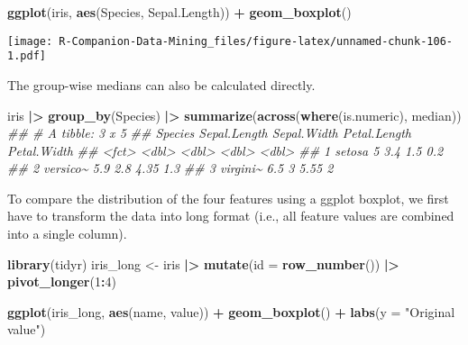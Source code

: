 \documentclass[
  notitlepage]{book}
\newenvironment{Shaded}{\begin{snugshade}}{\end{snugshade}}
\newcommand{\CommentTok}[1]{\textcolor[rgb]{0.56,0.35,0.01}{\textit{#1}}}
\newcommand{\DataTypeTok}[1]{\textcolor[rgb]{0.13,0.29,0.53}{#1}}
\newcommand{\DecValTok}[1]{\textcolor[rgb]{0.00,0.00,0.81}{#1}}
\newcommand{\ErrorTok}[1]{\textcolor[rgb]{0.64,0.00,0.00}{\textbf{#1}}}
\newcommand{\KeywordTok}[1]{\textcolor[rgb]{0.13,0.29,0.53}{\textbf{#1}}}
\newcommand{\NormalTok}[1]{#1}
\newcommand{\OperatorTok}[1]{\textcolor[rgb]{0.81,0.36,0.00}{\textbf{#1}}}
\newcommand{\StringTok}[1]{\textcolor[rgb]{0.31,0.60,0.02}{#1}}
\begin{document}
\begin{Shaded}
\begin{Highlighting}[]
\KeywordTok{ggplot}\NormalTok{(iris, }\KeywordTok{aes}\NormalTok{(Species, Sepal.Length)) }\OperatorTok{+}\StringTok{ }
\StringTok{  }\KeywordTok{geom\_boxplot}\NormalTok{()}
\end{Highlighting}
\end{Shaded}

\texttt{[image: R-Companion-Data-Mining\_files/figure-latex/unnamed-chunk-106-1.pdf]}

The group-wise medians can also be calculated directly.

\begin{Shaded}
\begin{Highlighting}[]
\NormalTok{iris }\OperatorTok{|}\ErrorTok{\textgreater{}}\StringTok{ }\KeywordTok{group\_by}\NormalTok{(Species) }\OperatorTok{|}\ErrorTok{\textgreater{}}\StringTok{ }
\StringTok{  }\KeywordTok{summarize}\NormalTok{(}\KeywordTok{across}\NormalTok{(}\KeywordTok{where}\NormalTok{(is.numeric), median))}
\CommentTok{\#\# \# A tibble: 3 x 5}
\CommentTok{\#\#   Species  Sepal.Length Sepal.Width Petal.Length Petal.Width}
\CommentTok{\#\#   \textless{}fct\textgreater{}           \textless{}dbl\textgreater{}       \textless{}dbl\textgreater{}        \textless{}dbl\textgreater{}       \textless{}dbl\textgreater{}}
\CommentTok{\#\# 1 setosa            5           3.4         1.5          0.2}
\CommentTok{\#\# 2 versico\textasciitilde{}          5.9         2.8         4.35         1.3}
\CommentTok{\#\# 3 virgini\textasciitilde{}          6.5         3           5.55         2}
\end{Highlighting}
\end{Shaded}

To compare the distribution of the four features using a ggplot boxplot,
we first have to transform the data into long format (i.e., all feature
values are combined into a single column).

\begin{Shaded}
\begin{Highlighting}[]
\KeywordTok{library}\NormalTok{(tidyr)}
\NormalTok{iris\_long \textless{}{-}}\StringTok{ }\NormalTok{iris }\OperatorTok{|}\ErrorTok{\textgreater{}}\StringTok{ }
\StringTok{  }\KeywordTok{mutate}\NormalTok{(}\DataTypeTok{id =} \KeywordTok{row\_number}\NormalTok{()) }\OperatorTok{|}\ErrorTok{\textgreater{}}\StringTok{ }
\StringTok{  }\KeywordTok{pivot\_longer}\NormalTok{(}\DecValTok{1}\OperatorTok{:}\DecValTok{4}\NormalTok{)}

\KeywordTok{ggplot}\NormalTok{(iris\_long, }\KeywordTok{aes}\NormalTok{(name, value)) }\OperatorTok{+}\StringTok{ }
\StringTok{  }\KeywordTok{geom\_boxplot}\NormalTok{() }\OperatorTok{+}
\StringTok{  }\KeywordTok{labs}\NormalTok{(}\DataTypeTok{y =} \StringTok{"Original value"}\NormalTok{)}
\end{Highlighting}
\end{Shaded}
\end{document}
